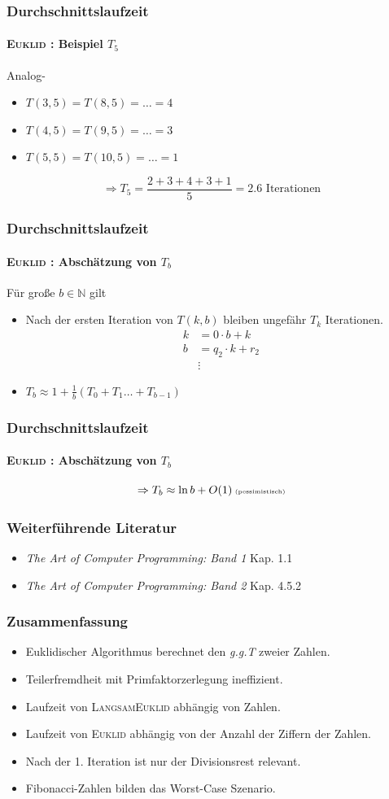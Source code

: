 \documentclass[•]{beamer}
\begin{document}
\begin{frame}	
		\frametitle{Durchschnittslaufzeit}
	\framesubtitle{\textsc{Euklid} : Beispiel $T_5$}
	Analog-
	\begin{itemize}
	\item $T(3,5) = T(8,5) = \dots = 4$
	\item $T(4,5) = T(9,5) = \dots = 3$
	\item $T(5,5) = T(10,5) = \dots = 1$
	\end{itemize}
	\vspace{20pt}
	 $$\Rightarrow T_5 = \frac{2+3+4+3+1}{5} = 2.6\text{ Iterationen}$$
	\end{frame}	

	\begin{frame}	
		\frametitle{Durchschnittslaufzeit}
	\framesubtitle{\textsc{Euklid} : Absch\"atzung von $T_b$}
	F\"ur gro{\ss}e $b \in \mathbb{N}$ gilt
	\begin{itemize}
	\item Nach der ersten Iteration von $T(k,b)$ bleiben ungef\"ahr $T_{k}$ Iterationen.
	\begin{align*}
	k&=0\cdot b + k\\
	b&=q_{2}\cdot k + r_2\\
	&\vdots
\end{align*}		
	\item $T_b \approx 1 + \frac{1}{b} (T_0 + T_1 \dots + T_{b-1})$
	\end{itemize}
\end{frame}		

\begin{frame}
\frametitle{Durchschnittslaufzeit}
\framesubtitle{\textsc{Euklid} : Absch\"atzung von $T_b$}
$$ \Rightarrow T_b \approx \ln b + O(1)\text{\tiny{ (pessimistisch)}}$$
\end{frame}

\begin{frame}
\frametitle{Weiterf\"uhrende Literatur}
\begin{itemize}
\item \textit{The Art of Computer Programming: Band 1} Kap. 1.1
\item \textit{The Art of Computer Programming: Band 2} Kap. 4.5.2
\end{itemize}
\end{frame}

\begin{frame}
\frametitle{Zusammenfassung}
\begin{itemize}
\item Euklidischer Algorithmus berechnet den \textit{g.g.T} zweier Zahlen.
\item Teilerfremdheit mit Primfaktorzerlegung ineffizient.
\item Laufzeit von \textsc{LangsamEuklid} abh\"angig von Zahlen.
\item Laufzeit von \textsc{Euklid} abh\"angig von der Anzahl der Ziffern der Zahlen.
\item Nach der 1. Iteration ist nur der Divisionsrest relevant.
\item Fibonacci-Zahlen bilden das Worst-Case Szenario.
\end{itemize}
\end{frame}
\end{document}
